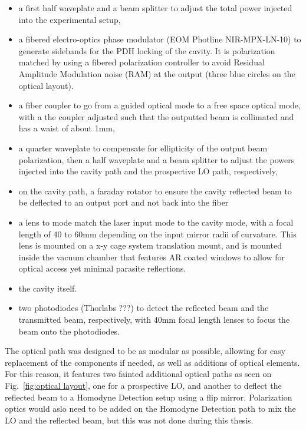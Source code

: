 \begin{itemize}
  \item a first half waveplate and a beam splitter to adjust the total power injected into the experimental setup,
  \item a fibered electro-optics phase modulator (EOM Photline NIR-MPX-LN-10) to generate sidebands for the PDH locking of the cavity. It is polarization matched by using a fibered polarization controller to avoid Residual Amplitude Modulation noise (RAM) at the output (three blue circles on the optical layout). 
  \item a fiber coupler to go from a guided optical mode to a free space optical mode, with a the coupler adjusted such that the outputted beam is collimated and has a waist of about 1mm,
  \item a quarter waveplate to compensate for ellipticity of the output beam polarization, then a half waveplate and a beam splitter to adjust the powers injected into the cavity path and the prospective LO path, respectively,
  \item on the cavity path, a faraday rotator to ensure the cavity reflected beam to be deflected to an output port and not back into the fiber 
  \item a lens to mode match the laser input mode to the cavity mode, with a focal length of 40 to 60mm depending on the input mirror radii of curvature. This lens is mounted on a x-y cage system translation mount, and is mounted inside the vacuum chamber that features AR coated windows to allow for optical access yet minimal parasite reflections.
  \item the cavity itself. 
  \item two photodiodes (Thorlabs ???) to detect the reflected beam and the transmitted beam, respectively, with 40mm focal length lenses to focus the beam onto the photodiodes. 
\end{itemize}

The optical path was designed to be as modular as possible, allowing for easy replacement of the components if needed, as well as additions of optical elements. For this reason, it features two fainted additional optical paths as seen on Fig.~\ref{fig:optical layout}, one for a prospective LO, and another to deflect the reflected beam to a Homodyne Detection setup using a flip mirror. Polarization optics would aslo need to be added on the Homodyne Detection path to mix the LO and the reflected beam, but this was not done during this thesis.

